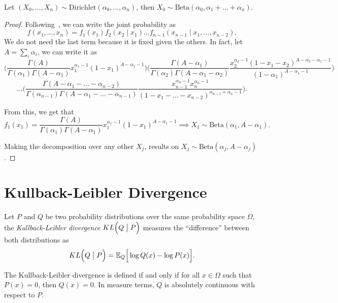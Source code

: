 \begin{proposition}\label{prop:dirichlet_marginal}
  Let
  \((X_{0},\dots, X_{n}) \sim \text{Dirichlet}(\alpha_{0}, \dots, \alpha_{n})\),
  then \(X_{0} \sim \text{Beta}(\alpha_{0}, \alpha_{1}+\dots +\alpha_{n})\).
\end{proposition}
\begin{proof}
  Following~\cite{farrow}, we can write the joint probability as
  \[
    f(x_{1},\dots,x_{n}) = f_{1}(x_{1})f_{2}(x_{2}\mid x_{1})\dots f_{n-1}(x_{n-1}\mid x_{1},\dots, x_{n-2}).
  \]
  We do not need the last term because it is fixed given the others. In fact, let \(A = \sum_{i} \alpha_{i}\), we can write it as
  \[
   \Bigg( \frac{\Gamma(A)}{\Gamma(\alpha_{1}) \Gamma(A - \alpha_{1})}x_{1}^{\alpha_{1}-1}(1 - x_{1})^{A - \alpha_{1} -1}\Bigg)\Bigg( \frac{\Gamma(A - \alpha_{1})}{\Gamma(\alpha_{2}) \Gamma(A - \alpha_{1} - \alpha_{2})}\frac{ x_{2}^{\alpha_{2}-1}(1-x_{1}- x_{2})^{A - \alpha_{2}- \alpha_{1} - 1} }{(1-\alpha_{1})^{A - \alpha_{1} - 1} }\Bigg )
 \]
 \[
   \dots \Big(\frac{\Gamma(A - \alpha_{1} - \dots - \alpha_{n-2})}{\Gamma(\alpha_{n-1}) \Gamma(A - \alpha_{1}- \dots - \alpha_{n-1})}  \frac{ x_{n-1}^{\alpha_{n}-1} x_{n}^{\alpha_{n}-1}}{(1-x_{1}- \dots - x_{n-2})^{\alpha_{n-1}+\alpha_{n}-1}}\Big).
 \]

 From this, we get that
 \[
   f_{1}(x_{1}) =  \frac{\Gamma(A)}{\Gamma(\alpha_{1}) \Gamma(A - \alpha_{1})}x_{1}^{\alpha_{1}-1}(1 - x_{1})^{A - \alpha_{1} -1} \implies X_{1} \sim \text{Beta}(\alpha_{1}, A- \alpha_{1}).
 \]

 Making the decomposition over any other \(X_{j}\), results on
 \(X_{j} \sim \text{Beta}(\alpha_{j}, A - \alpha_{j})\).
\end{proof}



\section{Kullback-Leibler Divergence}

\begin{definition}
  Let \(P\) and \(Q\) be two probability distributions over the same probability space \( \Omega \), the \emph{Kullback-Leibler divergence}
  \(KL\Big(Q \bigm| P\Big)\) measures the ``difference'' between both distributions as
  \[
    KL\Big(Q \bigm| P\Big) = \mathbb{E}_{Q}\Big[\log Q(x) - \log P(x)\Big].
  \]

  The Kullback-Leibler divergence is defined if and only if for all \( x \in \Omega \) such that \( P(x) = 0 \), then \( Q(x) = 0 \). In measure terms, \( Q \) is absolutely continuous with respect to \( P \).
\end{definition}

